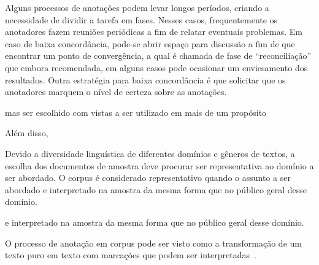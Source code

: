 
Alguns processos de anotações podem levar longos períodos, criando a necessidade de dividir a tarefa em fases. Nesses casos, frequentemente os anotadores fazem reuniões periódicas a fim de relatar eventuais problemas.  
Em caso de baixa concordância, pode-se abrir espaço para discussão a fim de que encontrar um ponto de convergência, a qual é chamada de fase de ``reconciliação'' que embora recomendada, em alguns casos pode ocasionar um enviesamento dos resultados. Outra estratégia para baixa concordância é que solicitar que os anotadores marquem o nível de certeza sobre as anotações.








mas ser escolhido com vistas a ser utilizado em mais de um propósito


Além disso, 



Devido a diversidade linguística de diferentes domínios e gêneros de textos, a escolha dos documentos de amostra deve procurar ser representativa ao domínio a ser abordado. O corpus é considerado representativo quando o assunto a ser abordado e interpretado na amostra da mesma forma que no público geral desse domínio.


e interpretado na amostra da mesma forma que no público geral desse domínio.











O processo de anotação em corpus pode ser visto como a transformação de um texto puro em texto com marcações que podem ser interpretadas~\cite{Hovy2010}.	
























